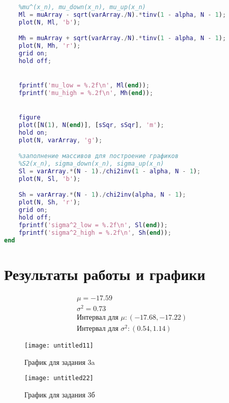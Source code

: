 \begin{lstlisting}[language=Matlab, caption=Текст программы]
	%заполнение массивов для построение графиков 
	%mu^(x_n), mu_down(x_n), mu_up(x_n) 
	Ml = muArray - sqrt(varArray./N).*tinv(1 - alpha, N - 1);
	plot(N, Ml, 'b');

	Mh = muArray + sqrt(varArray./N).*tinv(1 - alpha, N - 1);
	plot(N, Mh, 'r');
	grid on;
	hold off;


	fprintf('mu_low = %.2f\n', Ml(end));
	fprintf('mu_high = %.2f\n', Mh(end));


	figure
	plot([N(1), N(end)], [sSqr, sSqr], 'm');
	hold on;
	plot(N, varArray, 'g');

	%заполнение массивов для построение графиков 
	%S2(x_n), sigma_down(x_n), sigma_up(x_n)  
	Sl = varArray.*(N - 1)./chi2inv(1 - alpha, N - 1);
	plot(N, Sl, 'b');

	Sh = varArray.*(N - 1)./chi2inv(alpha, N - 1);
	plot(N, Sh, 'r');
	grid on;
	hold off;
	fprintf('sigma^2_low = %.2f\n', Sl(end));
	fprintf('sigma^2_high = %.2f\n', Sh(end));
end
\end{lstlisting}

\section*{Результаты работы и графики}

\begin{align}
\mu = -17.59\\
\sigma^2 = 0.73\\
\text{Интервал для }\mu: (-17.68,-17.22) \\ \nonumber
\text{Интервал для }\sigma^2: (0.54,1.14) 
\end{align}

\begin{figure}[h!]
\center\texttt{[image: untitled11]}
\caption{График для задания 3a}
\label{fig:image}
\end{figure}

\begin{figure}[h!]
	\center\texttt{[image: untitled22]}
	\caption{График для задания 3б}
	\label{fig:image1}
\end{figure}